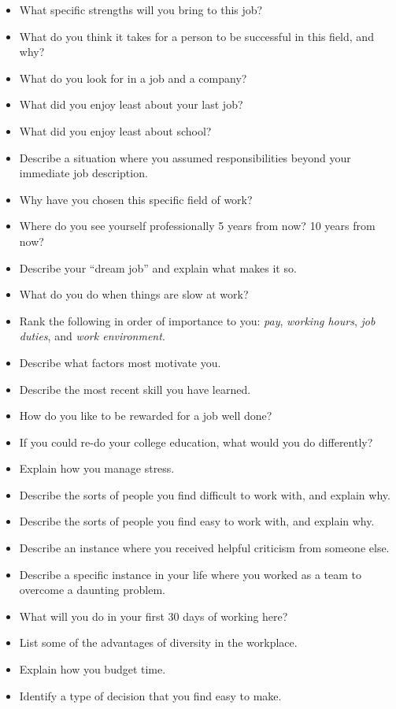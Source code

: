 \begin{itemize}
\item{} What specific strengths will you bring to this job?
\item{} What do you think it takes for a person to be successful in this field, and why?
\item{} What do you look for in a job and a company?
\item{} What did you enjoy least about your last job?
\item{} What did you enjoy least about school?
\item{} Describe a situation where you assumed responsibilities beyond your immediate job description.
\item{} Why have you chosen this specific field of work?
\item{} Where do you see yourself professionally 5 years from now?  10 years from now?
\item{} Describe your ``dream job'' and explain what makes it so.
\item{} What do you do when things are slow at work?
\item{} Rank the following in order of importance to you: {\it pay}, {\it working hours}, {\it job duties}, and {\it work environment}.
\item{} Describe what factors most motivate you.
\item{} Describe the most recent skill you have learned.
\item{} How do you like to be rewarded for a job well done?
\item{} If you could re-do your college education, what would you do differently?
\item{} Explain how you manage stress.
\item{} Describe the sorts of people you find difficult to work with, and explain why.
\item{} Describe the sorts of people you find easy to work with, and explain why.
\item{} Describe an instance where you received helpful criticism from someone else.
\item{} Describe a specific instance in your life where you worked as a team to overcome a daunting problem.
\item{} What will you do in your first 30 days of working here?
\item{} List some of the advantages of diversity in the workplace.
\item{} Explain how you budget time.
\item{} Identify a type of decision that you find easy to make.

\end{itemize}

